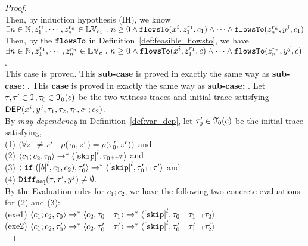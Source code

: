 \begin{proof}
\\
Then, by induction hypothesis (IH), we know 
\\
$\exists n \in \mathbb{N}, z_1^{r_1}, \cdots, z_n^{r_n} \in \mathbb{LV}_{{c_1}} ~.~ n \geq 0 \land
\mathtt{flowsTo}(x^i,  z_1^{r_1}, c_1) 
\land \cdots \land \mathtt{flowsTo}(z_n^{r_n}, y^j, c_1)$
\\
Then, by the $\mathtt{flowsTo}$ in Definition~\ref{def:feasible_flowsto}, we have 
\\
$\exists n \in \mathbb{N}, z_1^{r_1}, \cdots, z_n^{r_n} \in \mathbb{LV}_{{c}} ~.~ n \geq 0 \land
\mathtt{flowsTo}(x^i,  z_1^{r_1}, c) 
\land \cdots \land \mathtt{flowsTo}(z_n^{r_n}, y^j, c)$.
\\
This case is proved.
This \textbf{sub-case} is proved in exactly the same way as \textbf{sub-case: }.
  This \textbf{case} is proved in exactly the same way as \textbf{sub-case: }.
  Let $\mathtt{\tau}, \mathtt{\tau}' \in \mathcal{T}, \mathtt{\tau}_0 \in \mathcal{T}_0(c)$ be the two witness traces and initial trace satisfying 
  $\mathsf{DEP}(x^i, y^j, \mathtt{\tau}_1, \mathtt{\tau}_2, \mathtt{\tau}_0, c_1; c_2)$.
  \\
  By \emph{may-dependency} in Definition~\ref{def:var_dep}, let $\mathtt{\tau}_0' \in \mathcal{T}_0(c)$ be the initial trace satisfying,
  \\
  (1) $ (\forall z^r \neq x^i ~.~   \rho(\mathtt{\tau}_0, z^r ) =   \rho(\mathtt{\tau}_0',z^r) )$
  and \\
  (2) $\config{c_1;c_2 , \trace_0} 
  \rightarrow^{*} \config{\clabel{\eskip}^l, \trace_0  \tracecat \trace } $ 
    and \\
  (3) $\config{\eif(\clabel{\bexpr}^{l} , {c_1}, {c_2}), \trace_0'} \rightarrow^{*} \config{\clabel{\eskip}^l, \trace_0'  \tracecat \trace'}$ 
    and \\
    (4) $\mathtt{Diff}_{\mathtt{seq}}(\mathtt{\tau}, \mathtt{\tau}', y^j ) \neq \emptyset$.
    \\
  By the Evaluation rules for $c_1;c_2$, we have the following two concrete evaluations for (2) and (3):
  \\
  (exe1) $\config{c_1;c_2 , \trace_0} 
  \rightarrow^{*} \config{c_2, \trace_0  \tracecat \trace_1}
  \rightarrow^{*} \config{\clabel{\eskip}^l, \trace_0  \tracecat \trace_1 \tracecat \trace_2 } $ \\
  (exe2) $\config{{c_1}; {c_2}, \trace_0'}
  \rightarrow^{*} \config{c_2, \trace_0'  \tracecat \trace_1'}
  \rightarrow^{*} \config{\clabel{\eskip}^l, \trace_0'  \tracecat \trace_1' \tracecat \trace_2'}$ 
  \\

\end{proof}
